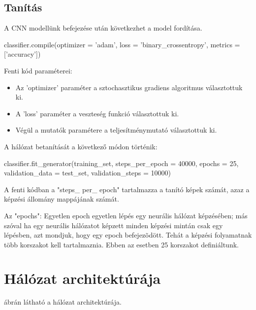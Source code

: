 \subsection{Tanítás}

A CNN modellünk befejezése után következhet a model fordítása.

\begin{python}
classifier.compile(optimizer = 'adam', loss = 'binary_crossentropy',
metrics = ['accuracy'])
\end{python}

Fenti kód paraméterei:
\begin{itemize}
\item Az 'optimizer' paraméter a sztochasztikus gradiens algoritmus választottuk ki.
\item A 'loss' paraméter a veszteség funkció választottuk ki.
\item Végül a mutatók paramétere a teljesítménymutató választottuk ki.
\end{itemize}

A hálózat betanítását a következő módon történik:

\begin{python}
classifier.fit_generator(training_set,
steps_per_epoch = 40000,
epochs = 25,
validation_data = test_set,
validation_steps = 10000)
\end{python}

A fenti kódban a "steps\_ per\_ epoch" tartalmazza a tanító képek számát, azaz a képzési állomány mappájának számát.

Az "epochs": Egyetlen epoch egyetlen lépés egy neurális hálózat képzésében; más szóval ha egy neurális hálózatot képzett minden képzési mintán csak egy lépésben, azt mondjuk, hogy egy epoch befejezõdött. Tehát a képzési folyamatnak több korszakot kell tartalmaznia. Ebben az esetben 25 korszakot definiáltunk.

\newpage

\section{Hálózat architektúrája}

 ábrán látható a hálózat architektúrája.

